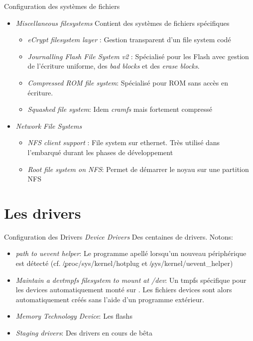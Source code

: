 \begin{frame}[fragile=singleslide]{Configuration des systèmes de fichiers}
  \begin{itemize}
  \item  \emph{Miscellaneous  filesystems}  Contient des  systèmes  de
    fichiers spécifiques
    \begin{itemize} 
    \item  \emph{eCrypt filesystem layer}  : Gestion  transparent d'un
      file system codé
    \item \emph{Journalling  Flash File  System v2} :  Spécialisé pour
      les  Flash avec  gestion de  l'écriture uniforme,  des \emph{bad
        blocks} et des \emph{erase blocks}.
    \item \emph{Compressed ROM file  system}: Spécialisé pour ROM sans
      accès en écriture.
    \item  \emph{Squashed   file  system}:  Idem   \emph{cramfs}  mais
      fortement compressé
    \end{itemize} 
  \item \emph{Network File Systems}
    \begin{itemize}
    \item \emph{NFS client support}  : File system sur ethernet.  Très
      utilisé dans l'embarqué durant les phases de développement
    \item \emph{Root file system on  NFS}: Permet de démarrer le noyau
      sur une partition NFS
    \end{itemize} 
  \end{itemize} 
\end{frame}

\section{Les drivers}

\begin{frame}[fragile=singleslide]{Configuration des Drivers}
  \emph{Device Drivers} Des centaines de drivers. Notons:
  \begin{itemize}
  \item   \emph{path to uevent helper}:  Le  programme   apellé  lorsqu'un
    nouveau            périphérique            est           détecté
    (cf.              \c{/proc/sys/kernel/hotplug}             et
    \c{/sys/kernel/uevent_helper})
  \item  \emph{Maintain a devtmpfs  filesystem to  mount at  /dev}: Un
    tmpfs  spécifique  pour  les  devices  automatiquement  monté  sur
    .   Les  fichiers  devices sont  alors  automatiquement
    créés sans l'aide d'un programme extérieur.
  \item \emph{Memory Technology Device}: Les flashs
  \item \emph{Staging drivers}: Des drivers en cours de bêta
  \end{itemize} 
\end{frame}

